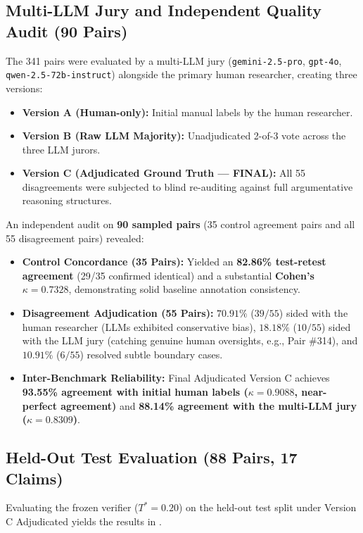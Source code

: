 \documentclass[11pt,a4paper]{article}
\begin{document}
\subsection{Multi-LLM Jury and Independent Quality Audit (90 Pairs)}
The 341 pairs were evaluated by a multi-LLM jury (\texttt{gemini-2.5-pro}, \texttt{gpt-4o}, \texttt{qwen-2.5-72b-instruct}) alongside the primary human researcher, creating three versions:
\begin{itemize}[leftmargin=*,itemsep=1pt]
    \item \textbf{Version A (Human-only):} Initial manual labels by the human researcher.
    \item \textbf{Version B (Raw LLM Majority):} Unadjudicated 2-of-3 vote across the three LLM jurors.
    \item \textbf{Version C (Adjudicated Ground Truth --- FINAL):} All 55 disagreements were subjected to blind re-auditing against full argumentative reasoning structures.
\end{itemize}

An independent audit on \textbf{90 sampled pairs} (35 control agreement pairs and all 55 disagreement pairs) revealed:
\begin{itemize}[leftmargin=*,itemsep=1pt]
    \item \textbf{Control Concordance (35 Pairs):} Yielded an \textbf{82.86\% test-retest agreement} (29/35 confirmed identical) and a substantial \textbf{Cohen's $\kappa = 0.7328$}, demonstrating solid baseline annotation consistency.
    \item \textbf{Disagreement Adjudication (55 Pairs):} $70.91\%$ ($39/55$) sided with the human researcher (LLMs exhibited conservative bias), $18.18\%$ ($10/55$) sided with the LLM jury (catching genuine human oversights, e.g., Pair \#314), and $10.91\%$ ($6/55$) resolved subtle boundary cases.
    \item \textbf{Inter-Benchmark Reliability:} Final Adjudicated Version C achieves \textbf{93.55\% agreement with initial human labels ($\kappa = 0.9088$, near-perfect agreement)} and \textbf{88.14\% agreement with the multi-LLM jury ($\kappa = 0.8309$)}.
\end{itemize}

\subsection{Held-Out Test Evaluation (88 Pairs, 17 Claims)}
Evaluating the frozen verifier ($T^* = 0.20$) on the held-out test split under Version C Adjudicated yields the results in .
\end{document}
